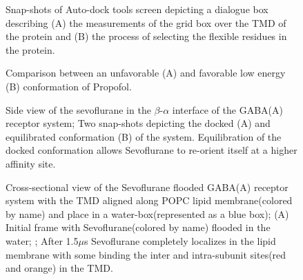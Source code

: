 \documentclass[12pt]{article}
\begin{document}
\begin{figure}
\begin{center}
\centering
\caption{Snap-shots of Auto-dock tools screen  depicting a dialogue box describing (A) the measurements of the grid box over the TMD of the protein and (B) the process of selecting the flexible residues in the protein. }
\label{fig:adtPic}
\end{center}
\end{figure}

\begin{figure}
\begin{center}
\centering
\caption{Comparison between an unfavorable (A) and favorable low energy (B) conformation of Propofol.}
\label{fig:PFLdihed}
\end{center}
\end{figure}

\begin{figure}
\begin{center}
\centering
\caption{Side view of the sevoflurane in the $\beta$-$\alpha$ interface of the GABA(A) receptor system; Two snap-shots depicting the docked (A) and equilibrated conformation (B) of the system. Equilibration of the docked conformation allows Sevoflurane to re-orient itself at a higher affinity site.}
\label{fig:sevMD}
\end{center}
\end{figure}


\begin{figure}
\begin{center}
\centering
\caption{Cross-sectional view of the Sevoflurane flooded GABA(A) receptor system with the TMD aligned along POPC lipid membrane(colored by name) and place in a water-box(represented as a blue box); (A) Initial frame with Sevoflurane(colored by name) flooded in the water; ; After  1.5$\mu$s  Sevoflurane completely localizes in the lipid membrane with some binding the inter and intra-subunit sites(red and orange) in the TMD.}
\label{fig:sevFlood}
\end{center}
\end{figure} 
\end{document}
